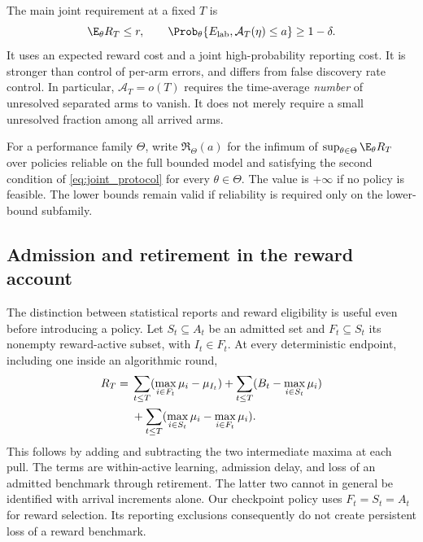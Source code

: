 The main joint requirement at a fixed $T$ is
\begin{equation}
 \E_\theta R_T\le r,\qquad
 \Prob_\theta\{E_{\rm lab},\mathcal A_T(\eta)\le a\}\ge1-\delta.
 \label{eq:joint_protocol}
\end{equation}
It uses an expected reward cost and a joint high-probability reporting cost.
It is stronger than control of per-arm errors, and differs from false discovery
rate control. In particular, $\mathcal A_T=o(T)$ requires the time-average
\emph{number} of unresolved separated arms to vanish. It does not merely
require a small unresolved fraction among all arrived arms.

For a performance family $\Theta$, write $\mathfrak R_\Theta(a)$ for the
infimum of $\sup_{\theta\in\Theta}\E_\theta R_T$ over policies reliable on the
full bounded model and satisfying the second condition of
\eqref{eq:joint_protocol} for every $\theta\in\Theta$. The value is $+\infty$
if no policy is feasible. The lower bounds remain valid if reliability is
required only on the lower-bound subfamily.

\subsection{Admission and retirement in the reward account}

The distinction between statistical reports and reward eligibility is useful
even before introducing a policy. Let $S_t\subseteq A_t$ be an admitted set and
$F_t\subseteq S_t$ its nonempty reward-active subset, with $I_t\in F_t$.
At every deterministic endpoint, including one inside an algorithmic round,
\begin{align}
 R_T={}&\sum_{t\le T}(\max_{i\in F_t}\mu_i-\mu_{I_t})
 +\sum_{t\le T}(B_t-\max_{i\in S_t}\mu_i)\notag\\
 &+\sum_{t\le T}(\max_{i\in S_t}\mu_i-\max_{i\in F_t}\mu_i).
 \label{eq:three_part}
\end{align}
This follows by adding and subtracting the two intermediate maxima at each
pull. The terms are within-active learning, admission delay, and loss of an
admitted benchmark through retirement. The latter two cannot in general be
identified with arrival increments alone. Our checkpoint policy uses
$F_t=S_t=A_t$ for reward selection. Its reporting exclusions consequently
do not create persistent loss of a reward benchmark.
